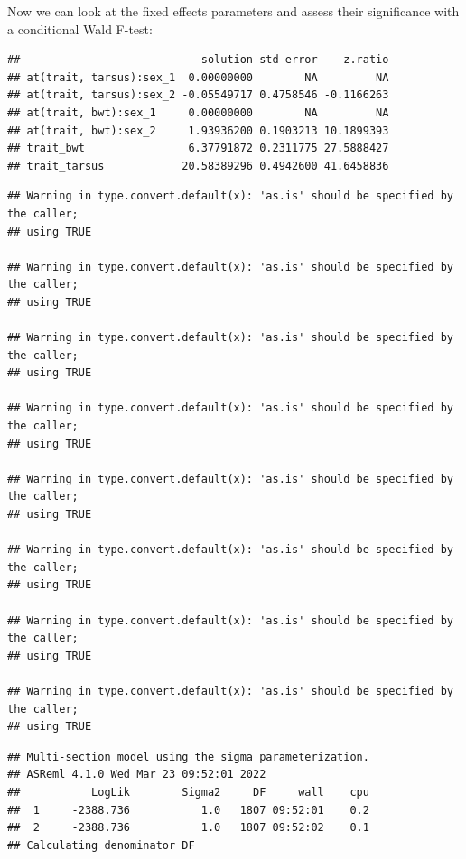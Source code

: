 \documentclass[
  12pt,
]{book}
\newenvironment{Shaded}{\begin{snugshade}}{\end{snugshade}}
\newcommand{\DataTypeTok}[1]{\textcolor[rgb]{0.13,0.29,0.53}{#1}}
\newcommand{\KeywordTok}[1]{\textcolor[rgb]{0.13,0.29,0.53}{\textbf{#1}}}
\newcommand{\NormalTok}[1]{#1}
\newcommand{\OperatorTok}[1]{\textcolor[rgb]{0.81,0.36,0.00}{\textbf{#1}}}
\newcommand{\OtherTok}[1]{\textcolor[rgb]{0.56,0.35,0.01}{#1}}
\newcommand{\StringTok}[1]{\textcolor[rgb]{0.31,0.60,0.02}{#1}}
\begin{document}
Now we can look at the fixed effects parameters and assess their significance with a conditional Wald F-test:

\begin{Shaded}
\end{Shaded}

\begin{verbatim}
##                            solution std error    z.ratio
## at(trait, tarsus):sex_1  0.00000000        NA         NA
## at(trait, tarsus):sex_2 -0.05549717 0.4758546 -0.1166263
## at(trait, bwt):sex_1     0.00000000        NA         NA
## at(trait, bwt):sex_2     1.93936200 0.1903213 10.1899393
## trait_bwt                6.37791872 0.2311775 27.5888427
## trait_tarsus            20.58389296 0.4942600 41.6458836
\end{verbatim}

\begin{verbatim}
## Warning in type.convert.default(x): 'as.is' should be specified by the caller;
## using TRUE

## Warning in type.convert.default(x): 'as.is' should be specified by the caller;
## using TRUE

## Warning in type.convert.default(x): 'as.is' should be specified by the caller;
## using TRUE

## Warning in type.convert.default(x): 'as.is' should be specified by the caller;
## using TRUE

## Warning in type.convert.default(x): 'as.is' should be specified by the caller;
## using TRUE

## Warning in type.convert.default(x): 'as.is' should be specified by the caller;
## using TRUE

## Warning in type.convert.default(x): 'as.is' should be specified by the caller;
## using TRUE

## Warning in type.convert.default(x): 'as.is' should be specified by the caller;
## using TRUE
\end{verbatim}

\begin{verbatim}
## Multi-section model using the sigma parameterization.
## ASReml 4.1.0 Wed Mar 23 09:52:01 2022
##           LogLik        Sigma2     DF     wall    cpu
##  1     -2388.736           1.0   1807 09:52:01    0.2
##  2     -2388.736           1.0   1807 09:52:02    0.1
## Calculating denominator DF
\end{verbatim}
\end{document}
